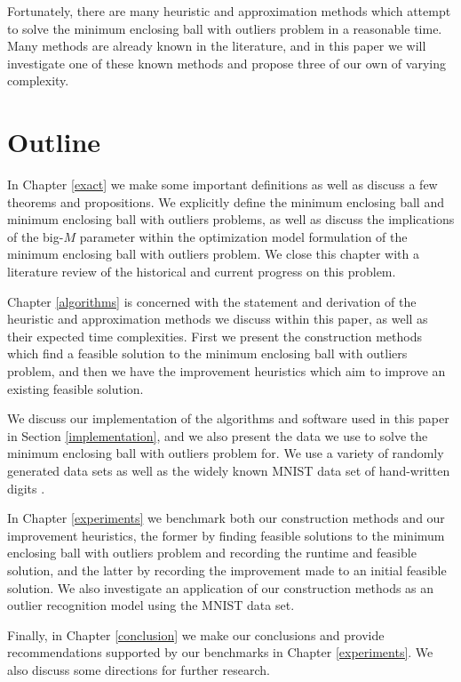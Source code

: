 \documentclass[11pt,twoside]{report}
\theoremstyle{definition}
\numberwithin{theorem}{section}
\numberwithin{definition}{section}
\numberwithin{lemma}{section}
\numberwithin{proposition}{section}
\numberwithin{equation}{section}
\numberwithin{figure}{section}
\begin{document}

Fortunately, there are many heuristic and approximation methods which attempt to solve the minimum enclosing ball with outliers problem in a reasonable time. Many methods are already known in the literature, and in this paper we will investigate one of these known methods and propose three of our own of varying complexity.


\section{Outline}

In Chapter \ref{exact} we make some important definitions as well as discuss a few theorems and propositions. We explicitly define the minimum enclosing ball and minimum enclosing ball with outliers problems, as well as discuss the implications of the big-$M$ parameter within the optimization model formulation of the minimum enclosing ball with outliers problem. We close this chapter with a literature review of the historical and current progress on this problem.

Chapter \ref{algorithms} is concerned with the statement and derivation of the heuristic and approximation methods we discuss within this paper, as well as their expected time complexities. First we present the construction methods which find a feasible solution to the minimum enclosing ball with outliers problem, and then we have the improvement heuristics which aim to improve an existing feasible solution. 

We discuss our implementation of the algorithms and software used in this paper in Section \ref{implementation}, and we also present the data we use to solve the minimum enclosing ball with outliers problem for. We use a variety of randomly generated data sets as well as the widely known MNIST data set of hand-written digits \cite{lecun2010mnist}.

In Chapter \ref{experiments} we benchmark both our construction methods and our improvement heuristics, the former by finding feasible solutions to the minimum enclosing ball with outliers problem and recording the runtime and feasible solution, and the latter by recording the improvement made to an initial feasible solution. We also investigate an application of our construction methods as an outlier recognition model using the MNIST data set.

Finally, in Chapter \ref{conclusion} we make our conclusions and provide recommendations supported by our benchmarks in Chapter \ref{experiments}. We also discuss some directions for further research.
\end{document}
